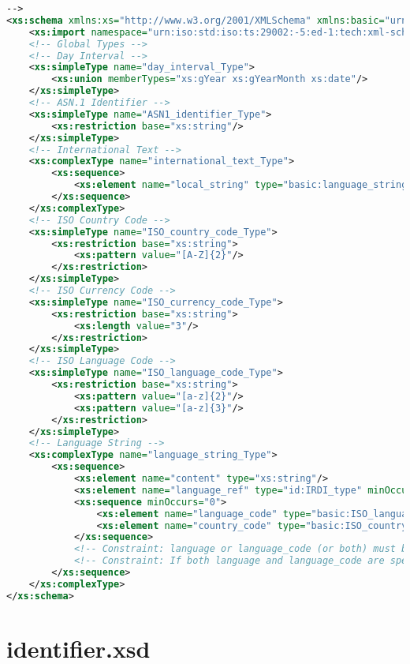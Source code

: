 \begin{lstlisting}[caption=basic.xsd, language=XML, label=lst:basic_xsd]
-->
<xs:schema xmlns:xs="http://www.w3.org/2001/XMLSchema" xmlns:basic="urn:iso:std:iso:ts:29002:-4:ed-1:tech:xml-schema:basic" xmlns:id="urn:iso:std:iso:ts:29002:-5:ed-1:tech:xml-schema:identifier" targetNamespace="urn:iso:std:iso:ts:29002:-4:ed-1:tech:xml-schema:basic" elementFormDefault="qualified">
	<xs:import namespace="urn:iso:std:iso:ts:29002:-5:ed-1:tech:xml-schema:identifier" schemaLocation="identifier.xsd"/>
	<!-- Global Types -->
	<!-- Day Interval -->
	<xs:simpleType name="day_interval_Type">
		<xs:union memberTypes="xs:gYear xs:gYearMonth xs:date"/>
	</xs:simpleType>
	<!-- ASN.1 Identifier -->
	<xs:simpleType name="ASN1_identifier_Type">
		<xs:restriction base="xs:string"/>
	</xs:simpleType>
	<!-- International Text -->
	<xs:complexType name="international_text_Type">
		<xs:sequence>
			<xs:element name="local_string" type="basic:language_string_Type" maxOccurs="unbounded"/>
		</xs:sequence>
	</xs:complexType>
	<!-- ISO Country Code -->
	<xs:simpleType name="ISO_country_code_Type">
		<xs:restriction base="xs:string">
			<xs:pattern value="[A-Z]{2}"/>
		</xs:restriction>
	</xs:simpleType>
	<!-- ISO Currency Code -->
	<xs:simpleType name="ISO_currency_code_Type">
		<xs:restriction base="xs:string">
			<xs:length value="3"/>
		</xs:restriction>
	</xs:simpleType>
	<!-- ISO Language Code -->
	<xs:simpleType name="ISO_language_code_Type">
		<xs:restriction base="xs:string">
			<xs:pattern value="[a-z]{2}"/>
			<xs:pattern value="[a-z]{3}"/>
		</xs:restriction>
	</xs:simpleType>
	<!-- Language String -->
	<xs:complexType name="language_string_Type">
		<xs:sequence>
			<xs:element name="content" type="xs:string"/>
			<xs:element name="language_ref" type="id:IRDI_type" minOccurs="0"/>
			<xs:sequence minOccurs="0">
				<xs:element name="language_code" type="basic:ISO_language_code_Type"/>
				<xs:element name="country_code" type="basic:ISO_country_code_Type" minOccurs="0"/>
			</xs:sequence>
			<!-- Constraint: language or language_code (or both) must be specified. -->
			<!-- Constraint: If both language and language_code are specified, then language and the combination of language_code and country_code must denote the same localized language. -->
		</xs:sequence>
	</xs:complexType>
</xs:schema>

 \end{lstlisting} 
 
\section{identifier.xsd}

